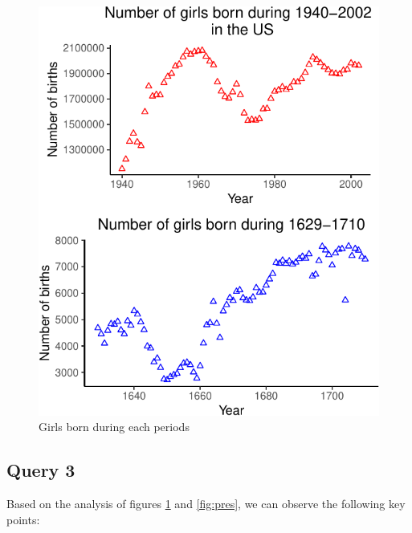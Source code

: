\documentclass[11pt,a4paper,]{article}
\begin{document}
\begin{figure}

{\centering \includegraphics{Arindom_Baruah_32779267_files/figure-latex/girlbirth-1} 

}

\caption{Girls born during each periods}\label{fig:girlbirth}
\end{figure}
\normalsize

\newpage

\hypertarget{query-3}{%
\subsection{Query 3}\label{query-3}}

Based on the analysis of figures \ref{fig:girlbirth} and \ref{fig:pres}, we can observe the following key points:
\end{document}
